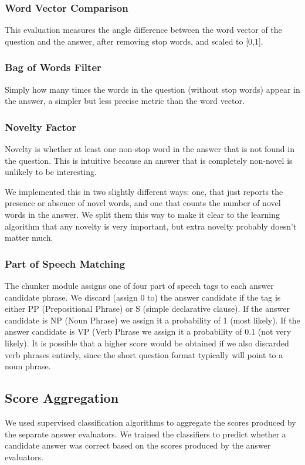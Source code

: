 \documentclass{article}
\begin{document}
\subsubsection{Word Vector Comparison}

This evaluation measures the angle difference between the word vector of the
question and the answer, after removing stop words, and scaled to [0,1].

\subsubsection{Bag of Words Filter}

Simply how many times the words in the question (without stop words) appear in
the answer, a simpler but less precise metric than the word vector.

\subsubsection{Novelty Factor}

Novelty is whether at least one non-stop word in the answer that is not found in
the question.  This is intuitive because an answer that is completely non-novel
is unlikely to be interesting.

We implemented this in two slightly different ways:  one, that just reports the
presence or absence of novel words, and one that counts the number of novel
words in the answer.  We split them this way to make it clear to the learning
algorithm that any novelty is very important, but extra novelty probably doesn't
matter much.

\subsubsection{Part of Speech Matching}
The chunker module assigns one of four part of speech tags to each answer candidate
phrase. We discard (assign 0 to) the answer candidate if the tag is either PP (Prepositional Phrase) 
or S (simple declarative clause). If the answer candidate is NP (Noun Phrase) we 
assign it a probability of 1 (most likely). If the answer candidate is VP (Verb Phrase
we assign it a probability of 0.1 (not very likely). It is possible that a higher score would be
obtained if we also discarded verb phrases entirely, since the short question format typically
will point to a noun phrase.

\subsection{Score Aggregation}
We used supervised classification algorithms to aggregate the scores produced
by the separate answer evaluators. We trained the classifiers to predict whether
a candidate answer was correct based on the scores produced by the answer evaluators.
\end{document}
